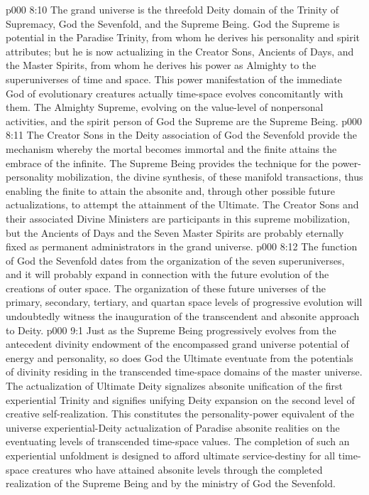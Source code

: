 \pc \vs p000 8:10 The grand universe is the threefold Deity domain of the Trinity of Supremacy, God the Sevenfold, and the Supreme Being. God the Supreme is potential in the Paradise Trinity, from whom he derives his personality and spirit attributes; but he is now actualizing in the Creator Sons, Ancients of Days, and the Master Spirits, from whom he derives his power as Almighty to the superuniverses of time and space. This power manifestation of the immediate God of evolutionary creatures actually time\hyp{}space evolves concomitantly with them. The Almighty Supreme, evolving on the value\hyp{}level of nonpersonal activities, and the spirit person of God the Supreme are the Supreme Being.
\vs p000 8:11 The Creator Sons in the Deity association of God the Sevenfold provide the mechanism whereby the mortal becomes immortal and the finite attains the embrace of the infinite. The Supreme Being provides the technique for the power\hyp{}personality mobilization, the divine synthesis, of  these manifold transactions, thus enabling the finite to attain the absonite and, through other possible future actualizations, to attempt the attainment of the Ultimate. The Creator Sons and their associated Divine Ministers are participants in this supreme mobilization, but the Ancients of Days and the Seven Master Spirits are probably eternally fixed as permanent administrators in the grand universe.
\vs p000 8:12 The function of God the Sevenfold dates from the organization of the seven superuniverses, and it will probably expand in connection with the future evolution of the creations of outer space. The organization of these future universes of the primary, secondary, tertiary, and quartan space levels of progressive evolution will undoubtedly witness the inauguration of the transcendent and absonite approach to Deity.
\vs p000 9:1 Just as the Supreme Being progressively evolves from the antecedent divinity endowment of the encompassed grand universe potential of energy and personality, so does God the Ultimate eventuate from the potentials of divinity residing in the transcended time\hyp{}space domains of the master universe. The actualization of Ultimate Deity signalizes absonite unification of the first experiential Trinity and signifies unifying Deity expansion on the second level of creative self\hyp{}realization. This constitutes the personality\hyp{}power equivalent of the universe experiential\hyp{}Deity actualization of Paradise absonite realities on the eventuating levels of transcended time\hyp{}space values. The completion of such an experiential unfoldment is designed to afford ultimate service\hyp{}destiny for all time\hyp{}space creatures who have attained absonite levels through the completed realization of the Supreme Being and by the ministry of God the Sevenfold.
